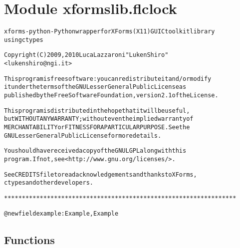 %
%
%


\section{Module xformslib.flclock}

    \label{xformslib:flclock}
\begin{alltt}

xforms-python - Python wrapper for XForms (X11) GUI C toolkit library
using ctypes

Copyright (C) 2009, 2010  Luca Lazzaroni "LukenShiro" 
    {\textless}lukenshiro@ngi.it{\textgreater}

This program is free software: you can redistribute it and/or modify
it under the terms of the GNU Lesser General Public License as
published by the Free Software Foundation, version 2.1 of the License.

This program is distributed in the hope that it will be useful,
but WITHOUT ANY WARRANTY; without even the implied warranty of
MERCHANTABILITY or FITNESS FOR A PARTICULAR PURPOSE. See the
GNU Lesser General Public License for more details.

You should have received a copy of the GNU LGPL along with this
program. If not, see {\textless}http://www.gnu.org/licenses/{\textgreater}.

See CREDITS file to read acknowledgements and thanks to XForms,
ctypes and other developers.

*****************************************************************


@newfield example: Example, Example
\end{alltt}



  \subsection{Functions}

